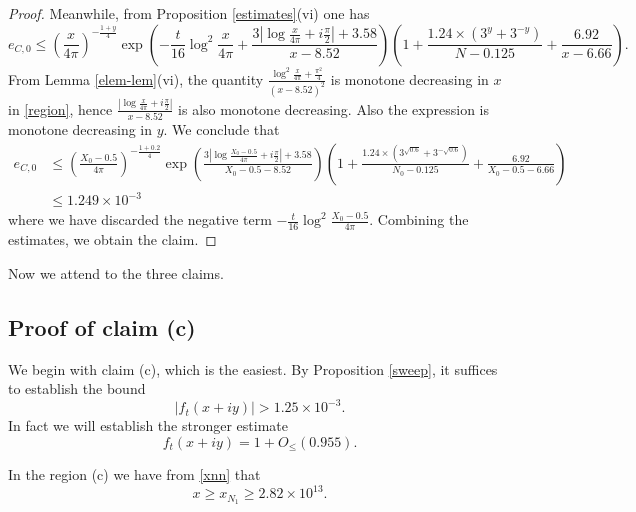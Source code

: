 \begin{proof}
Meanwhile, from Proposition \ref{estimates}(vi) one has
$$ e_{C,0} \leq \left(\frac{x}{4\pi}\right)^{-\frac{1+y}{4}} \exp\left( - \frac{t}{16} \log^2 \frac{x}{4\pi} + \frac{3 |\log \frac{x}{4\pi} + i \frac{\pi}{2}|+3.58}{x-8.52} \right) \left(1 + \frac{1.24 \times (3^y+3^{-y})}{N-0.125} + \frac{6.92}{x-6.66}\right).$$
From Lemma \ref{elem-lem}(vi), the quantity $\frac{\log^2 \frac{x}{4\pi} + \frac{\pi^2}{4}}{(x-8.52)^2}$ is monotone decreasing in $x$ in \eqref{region}, hence $\frac{|\log \frac{x}{4\pi} + i \frac{\pi}{2}|}{x-8.52}$ is also monotone decreasing.  Also the expression is monotone decreasing in $y$. We conclude that
\begin{equation}\label{ec0-bound}
\begin{split}
 e_{C,0} &\leq \left(\frac{X_0-0.5}{4\pi}\right)^{-\frac{1+0.2}{4}} \exp\left( \frac{3 |\log \frac{X_0-0.5}{4\pi} + i \frac{\pi}{2}|+3.58}{X_0-0.5-8.52} \right) \left(1 + \frac{1.24 \times (3^{\sqrt{0.6}}+3^{-\sqrt{0.6}})}{N_0-0.125} + \frac{6.92}{X_0-0.5-6.66}\right) \\
&\leq 1.249 \times 10^{-3}
\end{split}
\end{equation}
where we have discarded the negative term $- \frac{t}{16} \log^2 \frac{X_0-0.5}{4\pi}$.  Combining the estimates, we obtain the claim.
\end{proof}

Now we attend to the three claims.


\subsection{Proof of claim (c)}  

We begin with claim (c), which is the easiest.  
By Proposition \ref{sweep}, it suffices to establish the bound
$$ |f_t(x+iy)| > 1.25 \times 10^{-3}.$$
In fact we will establish the stronger estimate
\begin{equation}\label{ft0}
f_t(x+iy) = 1 + O_{\leq}( 0.955 ).
\end{equation}

In the region (c) we have from \eqref{xnn} that
$$ x \geq x_{N_1} \geq  2.82 \times 10^{13}.$$

